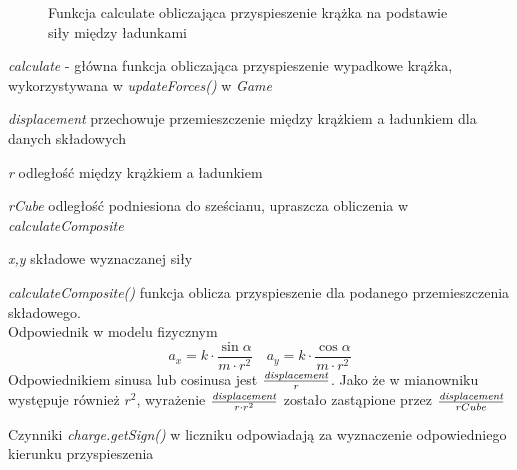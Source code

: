 \documentclass{article}
\begin{document}
\begin{enumerate}
\begin{figure}[H]
    \caption{Funkcja calculate obliczająca przyspieszenie krążka na podstawie siły między ładunkami}
    \label{fig:Funkcja_calculate}
    \end{figure}

\emph{calculate} - główna funkcja obliczająca przyspieszenie wypadkowe krążka, wykorzystywana w \emph{updateForces()} w \emph{Game}

\emph{displacement} przechowuje przemieszczenie między krążkiem a ładunkiem dla danych składowych

\emph{r} odległość między krążkiem a ładunkiem

\emph{rCube} odległość podniesiona do sześcianu, upraszcza obliczenia w\\
\emph{calculateComposite}

\emph{x,y} składowe wyznaczanej siły


\emph{calculateComposite()} funkcja oblicza przyspieszenie dla podanego przemieszczenia składowego. 
\\Odpowiednik w modelu fizycznym $$
a_{x}=k \cdot \frac{\sin \alpha}{m \cdot r^{2}} \quad a_{y}=k \cdot \frac{\cos \alpha}{m \cdot r^{2}}
$$
Odpowiednikiem sinusa lub cosinusa jest $\frac{\emph{displacement}}{r}$. Jako że w mianowniku występuje również $r^2$, wyrażenie $\frac{\emph{displacement}}{r \cdot r^2}$ zostało zastąpione przez $\frac{\emph{displacement}}{rCube}$

Czynniki \emph{charge.getSign()} w liczniku odpowiadają za wyznaczenie odpowiedniego kierunku przyspieszenia
    
    
\end{enumerate}
\end{document}
